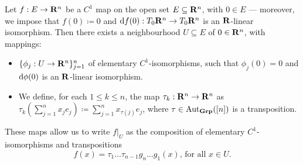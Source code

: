 \begin{proposition}
\label{prop:decomposition-elementary-C1}
Let \(f: E \to \mathbf{R}^n\) be a \(C^1\) map on the open set \(E \subseteq \mathbf{R}^n\),
with \(0 \in E\) --- moreover, we impose that \(f(0) \coloneq 0\) and \(\mathrm{d}
f(0): T_0\mathbf{R}^n \to T_0\mathbf{R}^n\) is an \(\mathbf{R}\)-linear isomorphism. Then there exists a
neighbourhood \(U \subseteq E\) of \(0 \in \mathbf{R}^n\), with mappings:
\begin{itemize}\setlength\itemsep{0em}
\item \(\{\phi_{j}: U \to \mathbf{R}^n\}_{j=1}^n\) of elementary \(C^1\)-isomorphisms,
  such that \(\phi_j(0) = 0\) and \(\mathrm{d} \phi(0)\) is an \(\mathbf{R}\)-linear
  isomorphism.
\item We define, for each \(1 \leq k \leq n\), the map \(\tau_k: \mathbf{R}^n \to \mathbf{R}^n\)
  as \(\tau_k(\sum_{j=1}^n x_j e_j) \coloneq \sum_{j=1}^n x_{\tau(j)} e_{j}\),
  where \(\tau \in \operatorname{Aut}_{{\textbf{Grp}}}([n])\) is a transposition.
\end{itemize}
These maps allow us to write \(f|_U\) as the composition of elementary
\(C^1\)-isomorphisms and transpositions
\[
  f(x) = \tau_1 \dots \tau_{n-1} g_n \dots g_1(x)\text{, for all } x \in U.
\]
\end{proposition}

